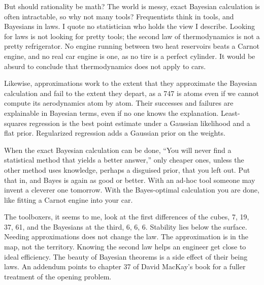 But should rationality be math? The world is messy, exact Bayesian calculation is often intractable, so why not many tools? Frequentists think in tools, and Bayesians in laws. I quote no statistician who holds the view I describe. Looking for laws is not looking for pretty tools; the second law of thermodynamics is not a pretty refrigerator. No engine running between two heat reservoirs beats a Carnot engine, and no real car engine is one, as no tire is a perfect cylinder. It would be absurd to conclude that thermodynamics does not apply to cars.

Likewise, approximations work to the extent that they approximate the Bayesian calculation and fail to the extent they depart, as a 747 is atoms even if we cannot compute its aerodynamics atom by atom. Their successes and failures are explainable in Bayesian terms, even if no one knows the explanation. Least-squares regression is the best point estimate under a Gaussian likelihood and a flat prior. Regularized regression adds a Gaussian prior on the weights.

When the exact Bayesian calculation can be done, ``You will never find a statistical method that yields a better answer,'' only cheaper ones, unless the other method uses knowledge, perhaps a disguised prior, that you left out. Put that in, and Bayes is again as good or better. With an ad-hoc tool someone may invent a cleverer one tomorrow. With the Bayes-optimal calculation you are done, like fitting a Carnot engine into your car. 

The toolboxers, it seems to me, look at the first differences of the cubes, 7, 19, 37, 61, and the Bayesians at the third, 6, 6, 6. Stability lies below the surface. Needing approximations does not change the law. The approximation is in the map, not the territory. Knowing the second law helps an engineer get close to ideal efficiency. The beauty of Bayesian theorems is a side effect of their being laws. An addendum points to chapter 37 of David MacKay's book for a fuller treatment of the opening problem.
